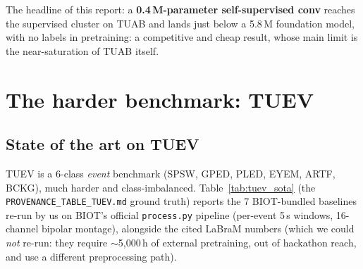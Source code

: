 \documentclass[10pt,a4paper]{article}
\begin{document}
\noindent The headline of this report: a \textbf{0.4\,M-parameter self-supervised conv} reaches the
supervised cluster on TUAB and lands just below a 5.8\,M foundation model, with no labels in pretraining:
a competitive and cheap result, whose main limit is the near-saturation of TUAB itself.

\section{The harder benchmark: TUEV}
\label{sec:tuev}

\subsection{State of the art on TUEV}
TUEV is a 6-class \emph{event} benchmark (SPSW, GPED, PLED, EYEM, ARTF, BCKG), much harder and class-imbalanced.
Table~\ref{tab:tuev_sota} (the \texttt{PROVENANCE\_TABLE\_TUEV.md} ground truth) reports the 7 BIOT-bundled
baselines re-run by us on BIOT's official \texttt{process.py} pipeline (per-event 5\,s windows, 16-channel
bipolar montage), alongside the cited LaBraM numbers (which we could \emph{not} re-run: they require
$\sim$5{,}000\,h of external pretraining, out of hackathon reach, and use a different preprocessing path).
\end{document}
